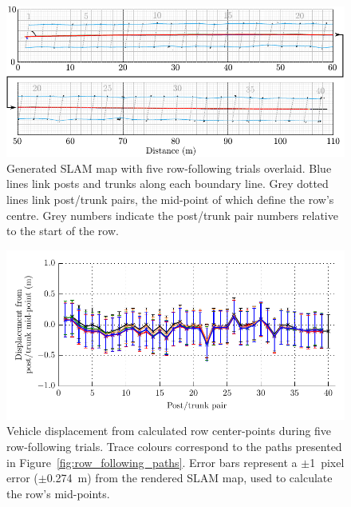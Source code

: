 \documentclass[preprint,authoryear,12pt]{elsarticle}
\begin{document}
    \begin{figure}[htb]
        \centering
        \includegraphics[width=\linewidth]{imgs/slam/segmented_analysis_with_centres.pdf}
        \caption{
            Generated SLAM map with five row-following trials overlaid.
            Blue lines link posts and trunks along each boundary line.
            Grey dotted lines link post/trunk pairs, the mid-point of which define the row's centre.
            Grey numbers indicate the post/trunk pair numbers relative to the start of the row.
        }
        \label{fig:row_following_paths_segmented}
    \end{figure}

    \begin{figure}[htb]
        \centering
        \includegraphics{imgs/slam/row_tracking_averages.pdf}
        \caption{
            Vehicle displacement from calculated row center-points during five row-following trials.
            Trace colours correspond to the paths presented in Figure~\ref{fig:row_following_paths}.
            Error bars represent a $\pm$\SI{1}{pixel} error ($\pm$\SI{0.274}{\meter}) from the rendered SLAM map, used to calculate the row's mid-points.
        }
        \label{fig:row_following_performance_analysis}
    \end{figure}
\end{document}

